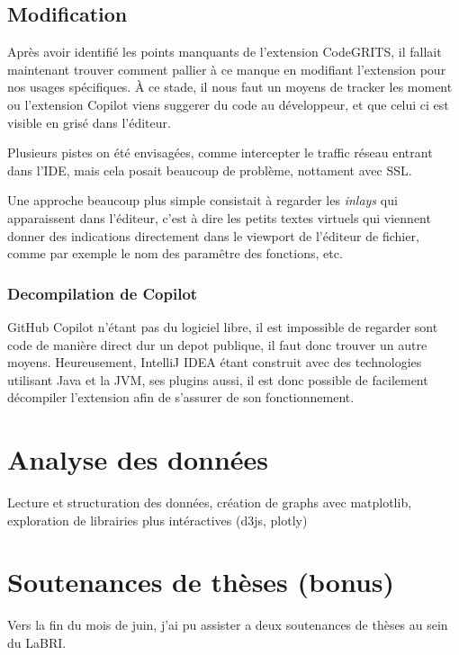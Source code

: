 \subsection{Modification}

Après avoir identifié les points manquants de l'extension CodeGRITS, il fallait maintenant trouver comment pallier à ce manque
en modifiant l'extension pour nos usages spécifiques.
À ce stade, il nous faut un moyens de tracker les moment ou l'extension Copilot viens suggerer du code au développeur, et que celui ci est visible
en grisé dans l'éditeur.

Plusieurs pistes on été envisagées, comme intercepter le traffic réseau entrant dans l'IDE, mais cela posait beaucoup de problème, nottament avec SSL.

Une approche beaucoup plus simple consistait à regarder les \emph{inlays} qui apparaissent dans l'éditeur,
c'est à dire les petits textes virtuels qui viennent donner des indications directement dans le viewport de l'éditeur de fichier,
comme par exemple le nom des paramêtre des fonctions, etc.

\subsubsection{Decompilation de Copilot}

GitHub Copilot n'étant pas du logiciel libre, il est impossible de regarder sont code de manière direct dur un depot publique, il faut donc trouver un autre moyens.
Heureusement, IntelliJ IDEA étant construit avec des technologies utilisant Java et la JVM, ses plugins aussi, il est donc possible de facilement décompiler l'extension afin de s'assurer de son fonctionnement.

\section{Analyse des données}

Lecture et structuration des données, création de graphs avec matplotlib, exploration de librairies plus intéractives (d3js, plotly)

\section{Soutenances de thèses (bonus)}

Vers la fin du mois de juin, j'ai pu assister a deux soutenances de thèses au sein du LaBRI.
